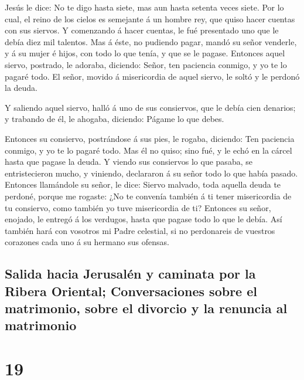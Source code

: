  Jesús le dice: No te digo hasta siete, mas aun hasta
setenta veces siete.  Por lo cual, el reino de los cielos
es semejante á un hombre rey, que quiso hacer cuentas con sus siervos.
 Y comenzando á hacer cuentas, le fué presentado uno que
le debía diez mil talentos.  Mas á éste, no pudiendo
pagar, mandó su señor venderle, y á su mujer é hijos, con todo lo que
tenía, y que se le pagase.  Entonces aquel siervo,
postrado, le adoraba, diciendo: Señor, ten paciencia conmigo, y yo te lo
pagaré todo.  El señor, movido á misericordia de aquel
siervo, le soltó y le perdonó la deuda.

 Y saliendo aquel siervo, halló á uno de sus consiervos,
que le debía cien denarios; y trabando de él, le ahogaba, diciendo:
Págame lo que debes.

 Entonces su consiervo, postrándose á sus pies, le
rogaba, diciendo: Ten paciencia conmigo, y yo te lo pagaré todo.
 Mas él no quiso; sino fué, y le echó en la cárcel hasta
que pagase la deuda.  Y viendo sus consiervos lo que
pasaba, se entristecieron mucho, y viniendo, declararon á su señor todo
lo que había pasado.  Entonces llamándole su señor, le
dice: Siervo malvado, toda aquella deuda te perdoné, porque me rogaste:
 ¿No te convenía también á ti tener misericordia de tu
consiervo, como también yo tuve misericordia de ti? 
Entonces su señor, enojado, le entregó á los verdugos, hasta que pagase
todo lo que le debía.  Así también hará con vosotros mi
Padre celestial, si no perdonareis de vuestros corazones cada uno á su
hermano sus ofensas.

\hypertarget{salida-hacia-jerusaluxe9n-y-caminata-por-la-ribera-oriental-conversaciones-sobre-el-matrimonio-sobre-el-divorcio-y-la-renuncia-al-matrimonio}{%
\subsection{Salida hacia Jerusalén y caminata por la Ribera Oriental;
Conversaciones sobre el matrimonio, sobre el divorcio y la renuncia al
matrimonio}\label{salida-hacia-jerusaluxe9n-y-caminata-por-la-ribera-oriental-conversaciones-sobre-el-matrimonio-sobre-el-divorcio-y-la-renuncia-al-matrimonio}}

\hypertarget{section-18}{%
\section{19}\label{section-18}}

